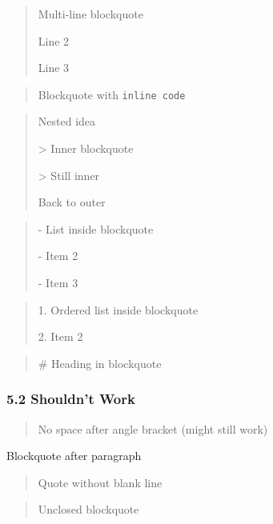 \documentclass{article}
\begin{document}
\begin{quote}
 Multi-line blockquote

 Line 2

 Line 3

\end{quote}

\begin{quote}
 Blockquote with \texttt{inline code}

\end{quote}

\begin{quote}
 Nested idea

> Inner blockquote

> Still inner

 Back to outer

\end{quote}

\begin{quote}
- List inside blockquote

- Item 2

- Item 3

\end{quote}

\begin{quote}
 1. Ordered list inside blockquote

 2. Item 2

\end{quote}

\begin{quote}
\# Heading in blockquote

\end{quote}

\subsubsection{ 5.2 Shouldn't Work}

\begin{quote}
No space after angle bracket (might still work)

\end{quote}

Blockquote after paragraph

\begin{quote}
 Quote without blank line

\end{quote}

\begin{quote}
 Unclosed blockquote

\end{quote}
\end{document}
